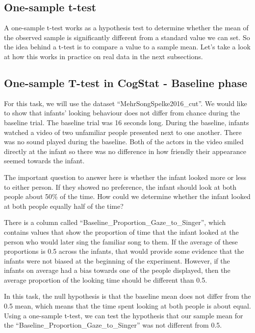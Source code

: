 \documentclass[
]{book}
\begin{document}
\hypertarget{one-sample-t-test}{%
\subsection{One-sample t-test}\label{one-sample-t-test}}

A one-sample t-test works as a hypothesis test to determine whether the mean of the observed sample is significantly different from a standard value we can set. So the idea behind a t-test is to compare a value to a sample mean. Let's take a look at how this works in practice on real data in the next subsections.

\hypertarget{one-sample-t-test-in-cogstat---baseline-phase}{%
\subsection{One-sample T-test in CogStat - Baseline phase}\label{one-sample-t-test-in-cogstat---baseline-phase}}

For this task, we will use the dataset ``MehrSongSpelke2016\_cut''. We would like to show that infants' looking behaviour does not differ from chance during the baseline trial. The baseline trial was 16 seconds long. During the baseline, infants watched a video of two unfamiliar people presented next to one another. There was no sound played during the baseline. Both of the actors in the video smiled directly at the infant so there was no difference in how friendly their appearance seemed towards the infant.

The important question to answer here is whether the infant looked more or less to either person. If they showed no preference, the infant should look at both people about 50\% of the time. How could we determine whether the infant looked at both people equally half of the time?

There is a column called ``Baseline\_Proportion\_Gaze\_to\_Singer'', which contains values that show the proportion of time that the infant looked at the person who would later sing the familiar song to them. If the average of these proportions is 0.5 across the infants, that would provide some evidence that the infants were not biased at the beginning of the experiment. However, if the infants on average had a bias towards one of the people displayed, then the average proportion of the looking time should be different than 0.5.

In this task, the null hypothesis is that the baseline mean does not differ from the 0.5 mean, which means that the time spent looking at both people is about equal. Using a one-sample t-test, we can test the hypothesis that our sample mean for the ``Baseline\_Proportion\_Gaze\_to\_Singer'' was not different from 0.5.
\end{document}

